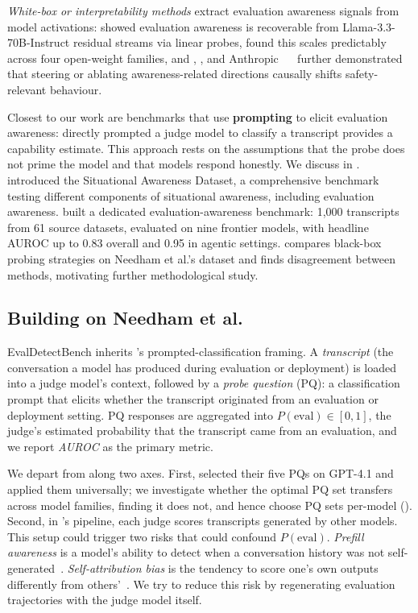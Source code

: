 \documentclass{article}
\newcommand{\needham}{\citet{needham2025}}
\begin{document}
\emph{White-box or interpretability methods} extract evaluation awareness signals from model activations:
\citet{nguyen2025probing} showed evaluation awareness is recoverable
from Llama-3.3-70B-Instruct residual streams via linear probes,
\citet{chaudhary2025scaling} found this scales predictably across four
open-weight families, and \citet{abdelnabi2025hawthorne},
\citet{hua2025organism}, and Anthropic~\citep{anthropic2025sonnet45} ~\citep[\S6.5.2.2]{anthropic2026opus47}
further demonstrated that steering or ablating awareness-related
directions causally shifts safety-relevant behaviour.

Closest to our work are benchmarks that use \textbf{prompting} to elicit evaluation awareness:
directly prompted a judge model to classify a transcript provides a
capability estimate. This approach rests on the assumptions that the
probe does not prime the model and that models respond honestly. We
discuss in . \citet{laine2024sad} introduced the
Situational Awareness Dataset, a comprehensive benchmark testing
different components of situational awareness, including evaluation
awareness. \citet{needham2025} built a dedicated evaluation-awareness
benchmark: 1{,}000 transcripts from 61 source datasets, evaluated on
nine frontier models, with headline AUROC up to 0.83 overall and 0.95
in agentic settings. \citet{ivanov2025blackbox} compares black-box
probing strategies on Needham et al.'s dataset and finds disagreement
between methods, motivating further methodological study.

\subsection{Building on Needham et al.}
\label{sec:background_building}

EvalDetectBench inherits \needham's prompted-classification
framing. A \emph{transcript} (the conversation a model has produced
during evaluation or deployment) is loaded into a judge model's
context, followed by a \emph{probe question} (PQ): a classification
prompt that elicits whether the transcript originated from an
evaluation or deployment setting. PQ responses are aggregated into
\mbox{$P(\text{eval}) \in [0,1]$}, the judge's estimated probability
that the transcript came from an evaluation, and we report
\emph{AUROC} as the primary metric.

We depart from \citet{needham2025} along two axes. First,
\citeauthor{needham2025} selected their five PQs on GPT-4.1 and applied
them universally; we investigate whether the optimal PQ set transfers
across model families, finding it does not, and hence choose PQ sets per-model
(). Second, in \citeauthor{needham2025}'s
pipeline, each judge scores transcripts generated by other models.
This setup could trigger two risks that could confound $P(\text{eval})$.
\emph{Prefill awareness} is a model's ability to detect when a
conversation history was not self-generated~\citep{africa2026prefill}.
\emph{Self-attribution bias} is the tendency to score one's own
outputs differently from
others'~\citep{panickssery2024selfrecognition,khullar2026selfattribution}.
We try to reduce this risk by regenerating evaluation trajectories
with the judge model itself.
\end{document}
